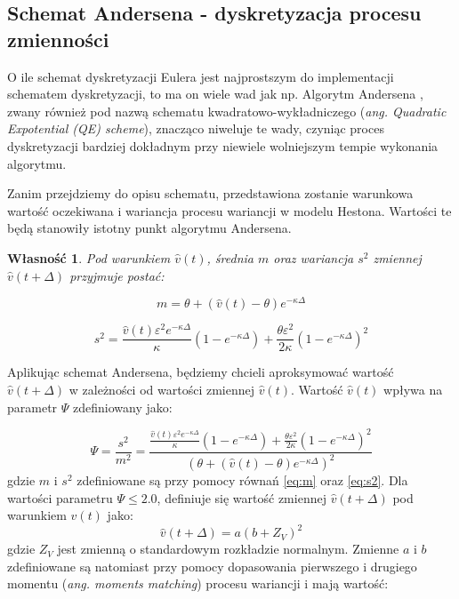 \documentclass{pracamgr}
\newtheorem{prop}{Własność}
\begin{document}
\subsection{Schemat Andersena - dyskretyzacja procesu zmienności}
\label{sec:algorytm_andersena}
O ile schemat dyskretyzacji Eulera jest najprostszym do implementacji schematem dyskretyzacji, to ma 
on wiele wad jak np.  
Algorytm Andersena \cite{Andersen}, zwany również pod nazwą schematu 
kwadratowo-wykładniczego (\textit{ang. Quadratic Expotential (QE) scheme}),
znacząco niweluje te wady, czyniąc proces dyskretyzacji bardziej dokładnym przy niewiele wolniejszym 
tempie wykonania algorytmu. 

Zanim przejdziemy do opisu schematu, przedstawiona zostanie warunkowa wartość oczekiwana i wariancja 
procesu wariancji w modelu Hestona. Wartości te będą stanowiły istotny punkt algorytmu Andersena.
\begin{prop}
Pod warunkiem $\hat{v}(t)$, średnia $m$ oraz wariancja $s^2$ zmiennej $\hat{v}(t + \Delta)$ przyjmuje 
postać:

\begin{equation}
  \label{eq:m}
  m= \theta + (\hat{v}(t) - \theta) e^{-\kappa \Delta}
\end{equation}

\begin{equation}
  \label{eq:s2}
  s^2 = \frac{\hat{v}(t)\varepsilon^2 e^{-\kappa \Delta}}{\kappa} (1 - e^{-\kappa \Delta}) + \frac{\theta \varepsilon^2}{2 \kappa}(1 - e^{-\kappa \Delta})^2
\end{equation}
\end{prop}
 

Aplikując schemat Andersena, będziemy chcieli aproksymować wartość  $\hat{v}(t + \Delta)$ w 
zależności od wartości zmiennej $\hat{v}(t)$. Wartość $\hat{v}(t)$ wpływa na parametr 
$\Psi$ zdefiniowany jako:


\begin{equation}
 \label{eq:ksi}
 \Psi = \frac{s^2}{m^2} = \frac{\frac{\hat{v}(t)\varepsilon^2 e^{-\kappa \Delta}}{\kappa} (1 - e^{-\kappa \Delta}) + \frac{\theta \varepsilon^2}{2 \kappa}(1 - e^{-\kappa \Delta})^2}{(\theta + (\hat{v}(t) - \theta) e^{-\kappa \Delta})^2} 
\end{equation}
gdzie $m$ i $s^2$ zdefiniowane są przy pomocy równań \ref{eq:m} oraz \ref{eq:s2}.
Dla wartości parametru $\Psi \leq 2.0$, definiuje się wartość zmiennej $\hat{v}(t + \Delta)$ pod 
warunkiem $\hat{v}(t)$ jako:
\begin{equation}
 \label{eq:vtbig}
\hat{v}(t + \Delta)  = a (b + Z_V)^2
\end{equation}
gdzie $Z_V$ jest zmienną o standardowym rozkładzie normalnym. Zmienne $a$ i $b$ zdefiniowane są 
natomiast przy pomocy dopasowania pierwszego i drugiego momentu (\textit{ang. moments matching}) 
procesu wariancji i mają wartość:
\end{document}
